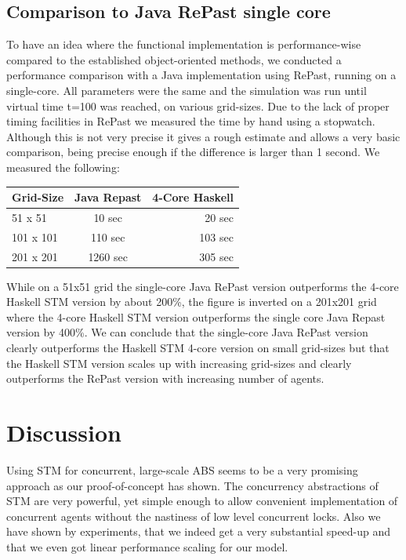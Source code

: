 \subsection{Comparison to Java RePast single core}
To have an idea where the functional implementation is performance-wise compared to the established object-oriented methods, we conducted a performance comparison with a Java implementation using RePast, running on a single-core. All parameters were the same and the simulation was run until virtual time t=100 was reached, on various grid-sizes. Due to the lack of proper timing facilities in RePast we measured the time by hand using a stopwatch. Although this is not very precise it gives a rough estimate and allows a very basic comparison, being precise enough if the difference is larger than 1 second. We measured the following:

\begin{center}
  \begin{tabular}{ l || c | r }
    Grid-Size & Java Repast & 4-Core Haskell \\ \hline \hline 
    51 x 51 & 10 sec & 20 sec \\ \hline
    101 x 101 & 110 sec & 103 sec \\ \hline
    201 x 201 & 1260 sec & 305 sec \\ \hline
  \end{tabular}
\end{center}

While on a 51x51 grid the single-core Java RePast version outperforms the 4-core Haskell STM version by about 200\%, the figure is inverted on a 201x201 grid where the 4-core Haskell STM version outperforms the single core Java Repast version by 400\%. We can conclude that the single-core Java RePast version clearly outperforms the Haskell STM 4-core version on small grid-sizes but that the Haskell STM version scales up with increasing grid-sizes and clearly outperforms the RePast version with increasing number of agents.

\section{Discussion}
\label{sect:stm_discussion}
Using STM for concurrent, large-scale ABS seems to be a very promising approach as our proof-of-concept has shown. The concurrency abstractions of STM are very powerful, yet simple enough to allow convenient implementation of concurrent agents without the nastiness of low level concurrent locks. Also we have shown by experiments, that we indeed get a very substantial speed-up and that we even got linear performance scaling for our model. 

